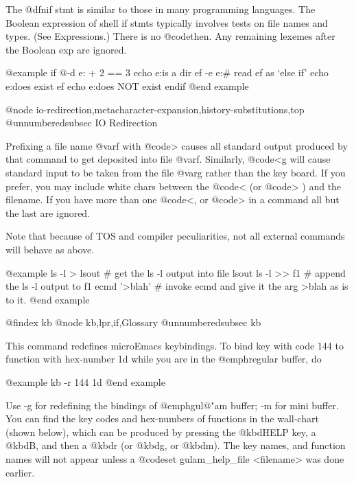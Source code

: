 {{The @dfn{if} stmt is similar to those in many programming languages.  The
Boolean expression of shell if stmts typically involves tests on file names
and types.  (See Expressions.) There is no @code{then}.  Any remaining
lexemes after the Boolean exp are ignored.

@example
if @{-d e:\gulam\lex@} + 2 == 3 
        echo e:\gulam\lex is a dir 
ef -e e:\gulam\lex      # read ef as `else if' 
        echo e:\gulam\lex does exist 
ef 
        echo e:\gulam\lex does NOT exist 
endif 
@end example

@node io-redirection,metacharacter-expansion,history-substitutions,top
@unnumberedsubsec IO Redirection

Prefixing a file name @var{f} with @code{>} causes all standard output
produced by that command to get deposited into file @var{f}.  Similarly,
@code{<g} will cause standard input to be taken from the file @var{g}
rather than the key board.  If you prefer, you may include white chars
between the @code{<} (or @code{>} ) and the filename.  If you have more
than one @code{<}, or @code{>} in a command all but the last are ignored.

Note that because of TOS and compiler peculiarities, not all external
commands will behave as above.

@example
ls -l > lsout # get the ls -l output into file lsout
ls -l >> f1   # append the ls -l output to f1
ecmd '>blah'  # invoke ecmd and give it the arg >blah as is to it.  
@end example

@findex kb
@node kb,lpr,if,Glossary
@unnumberedsubsec kb

This command redefines microEmacs keybindings.  To bind key with code 144
to function with hex-number 1d while you are in the @emph{regular} buffer,
do

@example
kb -r 144 1d      
@end example

Use -g for redefining the bindings of @emph{gul@"am} buffer; -m for mini
buffer.  You can find the key codes and hex-numbers of functions in the
wall-chart (shown below), which can be produced by pressing the @kbd{HELP}
key, a @kbd{B}, and then a @kbd{r} (or @kbd{g}, or @kbd{m}).  The key
names, and function names will not appear unless a @code{set
gulam_help_file <filename>} was done earlier.

}}
